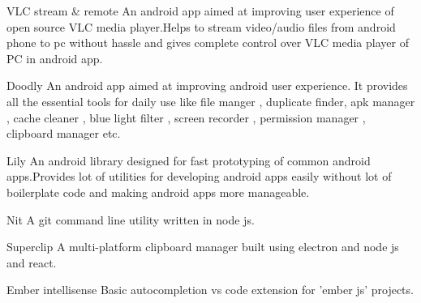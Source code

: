 
\begin{cventries}
  \cvproject
    {VLC stream \& remote} %
    { \quad An android app aimed at improving user experience of open source VLC media player.Helps to stream video/audio files from android phone to pc without hassle and gives complete control over VLC media player of PC in android app.} %
  
  \cvproject
    {Doodly}
    { \quad An android app aimed at improving android user experience. It provides all the essential tools for daily use like file manger , duplicate finder, apk manager , cache cleaner , blue light filter , screen recorder , permission manager , clipboard manager etc.}

  \cvproject
    {Lily}
    { \quad An android library designed for fast prototyping of common android apps.Provides lot of utilities for developing android apps easily without lot of boilerplate code and making android apps more manageable.}

  \cvproject
    {Nit}
    { \quad A git command line utility written in node js.}

  \cvproject
    {Superclip}
    { \quad A multi-platform clipboard manager built using electron and node js and react.}
  
  \cvproject
    {Ember intellisense}
    { \quad Basic autocompletion vs code extension for 'ember js' projects.}

\end{cventries}
